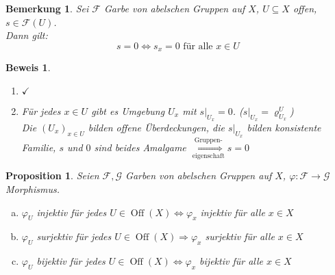 \documentclass[a4paper,12pt]{report}
\theoremstyle{break}
\newtheorem{Bem}[Def]{Bemerkung}
\newtheorem{Prop}[Def]{Proposition}
\theoremstyle{nonumberbreak}
\newtheorem{bew}{Beweis}
\theoremstyle{nonumberplain}
\newcommand{\quot}[1]{\textrm{\glqq}{#1}\textrm{\grqq}}
\newenvironment{twosidedproof}{\begin{enumerate}[\quot{$\Rightarrow$}:]}{\end{enumerate}}
\newcommand{\proofforward}{\item[\quot{$\Rightarrow$}:]}
\newcommand{\proofreverse}{\item[\quot{$\Leftarrow$}:]}
\DeclareMathOperator{\Off}{Off}
\newcommand{\calF}{\mathcal{F}}
\newcommand{\calG}{\mathcal{G}}
\begin{document}

\begin{Bem}\label{1.7}
Sei $\calF$ Garbe von abelschen Gruppen auf $X$, $U\subseteq X$ offen, $s\in \calF(U)$.\\
Dann gilt:
	\[s=0 \Leftrightarrow s_x = 0 \text{ f\"ur alle } x\in U\]
\end{Bem}

\begin{bew}\begin{twosidedproof}
\proofforward
	$\checkmark$
\proofreverse
	F\"ur jedes $x\in U$ gibt es Umgebung $U_x$ mit $s|_{U_x} = 0$. ($s|_{U_x} = \varrho_{U_x}^U$)\\
	Die $(U_x)_{x\in U}$ bilden offene \"Uberdeckungen, die $s|_{U_x}$ bilden konsistente Familie, $s$ und $0$ sind beides Amalgame $\overset{\text{Gruppen-}}{\underset{\text{eigenschaft}}{\Longrightarrow}} s= 0$
\end{twosidedproof}\end{bew}

\begin{Prop}\label{1.8}
Seien $\calF, \calG$ Garben von abelschen Gruppen auf $X$, $\varphi: \calF \to \calG$ Morphismus.
\begin{enumerate}[a)]
\item\label{1.8a}
	$\varphi_U$ injektiv f\"ur jedes $U\in \Off(X) \Leftrightarrow \varphi_x$ injektiv f\"ur alle $x\in X$
\item
	$\varphi_U$ surjektiv f\"ur jedes $U\in \Off(X) \Rightarrow \varphi_x$ surjektiv f\"ur alle $x\in X$
\item
	$\varphi_U$ bijektiv f\"ur jedes $U\in \Off(X) \Leftrightarrow \varphi_x$ bijektiv f\"ur alle $x\in X$
\end{enumerate}\end{Prop}
\end{document}
